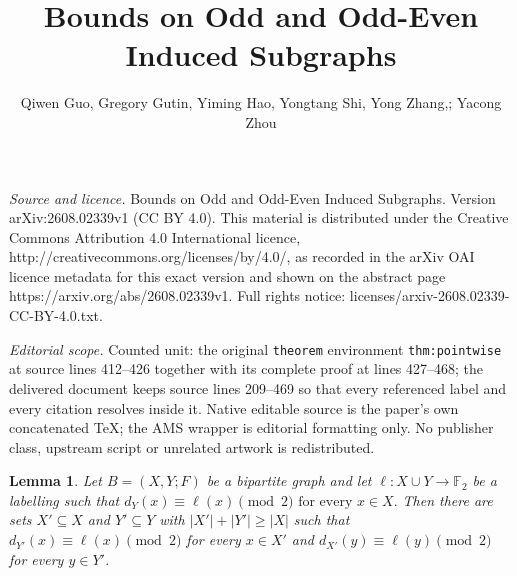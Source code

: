 \documentclass[10pt,a4paper]{amsart}
\newtheorem{lemma}[theorem]{Lemma}
\newcommand{\F}{\mathbb{F}}
\newcommand{\1}{\mathbf{1}}
\begin{document}
\title[Bounds on Odd and Odd-Even Induced Subgraphs]{Bounds on Odd and Odd-Even Induced Subgraphs}
\author{Qiwen Guo, Gregory Gutin, Yiming Hao, Yongtang Shi, Yong Zhang,; Yacong Zhou}
\date{}
\maketitle
\noindent\emph{Source and licence.} Bounds on Odd and Odd-Even Induced Subgraphs. Version arXiv:2608.02339v1 (CC BY 4.0). This material is distributed under the Creative Commons Attribution 4.0 International licence, http://creativecommons.org/licenses/by/4.0/, as recorded in the arXiv OAI licence metadata for this exact version and shown on the abstract page https://arxiv.org/abs/2608.02339v1. Full rights notice: licenses/arxiv-2608.02339-CC-BY-4.0.txt.\par\smallskip
\noindent\textit{Editorial scope.} Counted unit: the original \texttt{theorem} environment \texttt{thm:pointwise} at source lines 412--426 together with its complete proof at lines 427--468; the delivered document keeps source lines 209--469 so that every referenced label and every citation resolves inside it. Native editable source is the paper's own concatenated TeX; the AMS wrapper is editorial formatting only. No publisher class, upstream script or unrelated artwork is redistributed.
	\begin{lemma}\label{lem:completion}
		Let $B=(X,Y;F)$ be a bipartite graph and let $\ell:X\cup Y\to\F_2$ be a labelling such that
		$
		d_Y(x)\equiv \ell(x)\pmod 2
		\text{  for every }x\in X.
		$
		Then there are sets $X'\subseteq X$ and $Y'\subseteq Y$ with $|X'|+|Y'|\ge |X|$ such that
		$
		d_{Y'}(x)\equiv \ell(x)\pmod 2
		$
		for every $x\in X'$ and
		$
		d_{X'}(y)\equiv \ell(y)\pmod 2
		$
		for every $y\in Y'$.
	\end{lemma}
	
\end{document}
